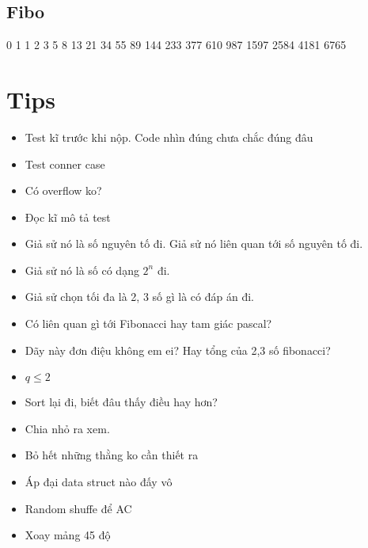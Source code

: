 \documentclass[A4 paper, 12pt, oneside]{article}
\begin{document}
\begin{landscape}
\begin{multicols}{2}
	\subsection{Fibo}
	0 1 1 2 3 5 8 13 21 34 55 89 144 233 377 610 987 1597 2584 4181 6765
	\section{Tips}
	\begin{itemize}[topsep=0pt, partopsep=0pt, itemsep=0pt]
	\item Test kĩ trước khi nộp. Code nhìn đúng chưa chắc đúng đâu
	\item Test conner case
	\item Có overflow ko?
	\item Đọc kĩ mô tả test
	\item Giả sử nó là số nguyên tố đi. Giả sử nó liên quan tới số nguyên tố đi.\\
	\item Giả sử nó là số có dạng \(2^n\) đi.\\
	\item Giả sử chọn tối đa là 2, 3 số gì là có đáp án đi.\\
	\item Có liên quan gì tới Fibonacci hay tam giác pascal?\\
	\item Dãy này đơn điệu không em ei? Hay tổng của 2,3 số fibonacci?\\
	\item \(q \leq 2\)\\
	\item Sort lại đi, biết đâu thấy điều hay hơn?\\
	\item Chia nhỏ ra xem.\\
	\item Bỏ hết những thằng ko cần thiết ra\\
	\item Áp đại data struct nào đấy vô\\
	\item Random shuffe để AC\\
	\item Xoay mảng 45 độ\\
	\end{itemize}

	\end{multicols}

	\end{landscape}
\end{document}
